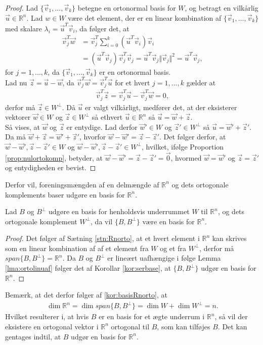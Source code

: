 \begin{proof}
Lad $\{\vec{v}_1,...,\vec{v}_k\}$ betegne en ortonormal basis for $W$, og betragt en vilkårlig $\vec{u} \in \mathds{R}^n$. 
Lad $w \in W$ være det element, der er en linear kombination af $\{\vec{v}_1,...,\vec{v}_k\}$ med skalare $\lambda_i = \vec{u}^T\vec{v}_i$, da følger det, at
\begin{align*}
\vec{v}_j^T\vec{w} &= \vec{v}_j^T\sum_{i=0}^k(\vec{u}^T\vec{v}_i)\vec{v}_i
\\ & = (\vec{u}^T\vec{v}_j)\vec{v}_j^T\vec{v}_j = \vec{u}^T\vec{v}_j \Vert \vec{v}_j \Vert^2 = \vec{u}^T\vec{v}_j,
\end{align*}
for $j=1,...,k$, da $\{\vec{v}_1,...,\vec{v}_k\}$ er en ortonormal basis.
\\ Lad nu $\vec{z} = \vec{u}- \vec{w}$, da $\vec{v}_j^T\vec{w}= \vec{v}_j^T\vec{u}$ for et hvert $j=1,...,k$ gælder at 
\begin{align*}
\vec{v}_j^T\vec{z} = \vec{v}_j^T\vec{u}- \vec{v}_j^T\vec{w} = 0,
\end{align*}
derfor må $\vec{z} \in W^{\bot}$. 
Då $\vec{u}$ er valgt vilkårligt, medfører det, at der eksisterer vektorer $\vec{w} \in W$ og $\vec{z} \in W^{\bot}$ så ethvert $\vec{u} \in \mathds{R}^n$ så $\vec{u}= \vec{w}+\vec{z}$.
\\Så vises, at $\vec{w}$ og $\vec{z}$ er entydige.
Lad derfor $\vec{w}' \in W$ og $\vec{z}' \in W^{\bot}$ så $\vec{u}= \vec{w}' + \vec{z}'$.
Da må $\vec{w} + \vec{z} = \vec{w}' + \vec{z}'$, hvorfor $\vec{w}-\vec{w}' = \vec{z}-\vec{z}'$.
Det følger derfor, at $\vec{w}-\vec{w}', \vec{z}-\vec{z}' \in W$ og $\vec{w}-\vec{w}', \vec{z}-\vec{z}' \in W^{\bot}$, hvilket, ifølge Proportion \ref{prop:nulortokomp}, betyder, at $\vec{w}-\vec{w}' = \vec{z}-\vec{z}' = \vec{0}$, hvormed $\vec{w}= \vec{w}'$ og $\vec{z}=\vec{z}'$ og entydigheden er bevist.
\end{proof}
Derfor vil, foreningsmængden af en delmængde af $\mathds{R}^n$ og dets ortogonale komplements baser udgøre en basis for $\mathds{R}^n$.
\begin{kor}
Lad $B$  og $B^{\bot}$ udgøre en basis for henholdsvis underrummet $W$ til $\mathds{R}^n$, og dets ortogonale komplement $W^{\bot}$, da vil $\{B, B^{\bot}\}$ være en basis for $\mathds{R}^n$.
\label{kor:basisRnorto}
\end{kor}
\begin{proof}
Det følger af Sætning \ref{stn:Rnorto}, at et hvert element i $\mathds{R}^n$ kan skrives som en linear kombination af af et element fra $W$ og et fra $W^{\bot}$, derfor må $span\{B, B^{\bot}\} = \mathds{R}^n$. 
Da $B$ og $B^{\bot}$ er lineært uafhængige i følge Lemma \ref{lma:ortolinuaf} følger det af Korollar \ref{kor:serbase}, at $\{B, B^{\bot}\}$ udgør en basis for $\mathds{R}^n$.
\end{proof}
Bemærk, at det derfor følger af \ref{kor:basisRnorto}, at
\begin{align}
\dim{\mathds{R}^n} = \dim{span\{B, B^{\bot}\}} = \dim{W} + \dim{W^{\bot}} = n.
\end{align}
Hvilket resulterer i, at hvis $B$ er en basis for et ægte underrum i $\mathds{R}^n$, så vil der eksistere en ortogonal vektor i $\mathds{R}^n$ ortogonal til $B$, som kan tilføjes $B$. 
Det kan gentages indtil, at $B$ udgør en basis for $\mathds{R}^n$.
